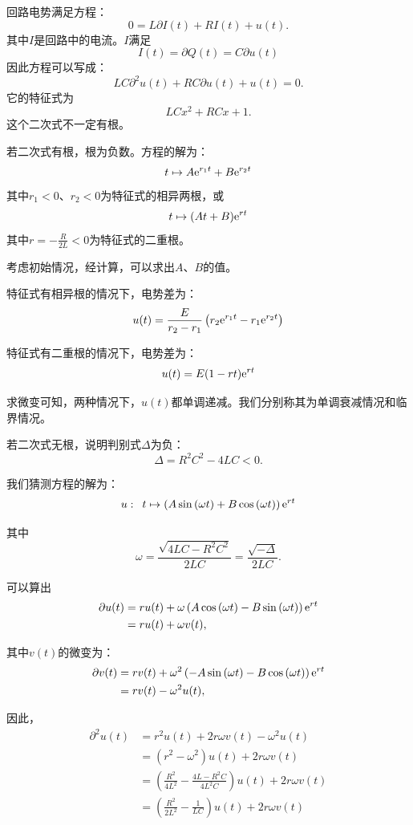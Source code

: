 \documentclass[12pt,UTF8,fontset=none]{ctexbook}
\begin{document}
\begin{so}
    回路电势满足方程：
    $$ 0 = L\partial I(t) + RI(t) + u(t).$$
    其中$I$是回路中的电流。$I$满足
    $$ I(t) = \partial Q(t) = C\partial u(t) $$
    因此方程可以写成：
    $$ LC\partial^2 u(t) + RC\partial u(t) + u(t) = 0.$$
    它的特征式为
    $$ LC x^2 + RC x + 1.$$
    这个二次式不一定有根。

    若二次式有根，根为负数。方程的解为：
    $$ t \mapsto A\mathrm{e}^{r_1t} + B\mathrm{e}^{r_2t} $$
    其中$r_1<0$、$r_2<0$为特征式的相异两根，或
    $$ t \mapsto (At + B)\mathrm{e}^{rt} $$
    其中$r = -\frac{R}{2L} < 0$为特征式的二重根。

    考虑初始情况，经计算，可以求出$A$、$B$的值。

    特征式有相异根的情况下，电势差为：
    $$ u(t) = \frac{E}{r_2 - r_1}\left(r_2\mathrm{e}^{r_1t} - r_1\mathrm{e}^{r_2t}\right) $$ 

    特征式有二重根的情况下，电势差为：
    $$ u(t) =  E(1 - rt)\mathrm{e}^{rt}$$

    求微变可知，两种情况下，$u(t)$都单调递减。我们分别称其为单调衰减情况和临界情况。

    若二次式无根，说明判别式$\Delta$为负：
    $$ \Delta = R^2C^2 - 4LC < 0.$$

    我们猜测方程的解为：
    $$ u: \,\,\,t \mapsto \left(A\sin{(\omega t)} + B\cos{(\omega t)}\right)\mathrm{e}^{rt} $$

    其中
    $$\omega = \frac{\sqrt{4LC - R^2C^2}}{2LC} = \frac{\sqrt{-\Delta}}{2LC}. $$

    可以算出
    \begin{align*}
        \partial u(t) &= ru(t) + \omega \left(A\cos{(\omega t)} - B\sin{(\omega t)}\right)\mathrm{e}^{rt} \\
        &= ru(t) + \omega v(t),
    \end{align*}

    其中$v(t)$的微变为：
    \begin{align*}
        \partial v(t) &= rv(t) + \omega^2 \left(- A\sin{(\omega t)} - B\cos{(\omega t)}\right)\mathrm{e}^{rt} \\
        &= rv(t) - \omega^2 u(t),
    \end{align*}

    因此，
    \begin{align*}        
        \partial^2 u(t) &= r^2u(t) + 2r\omega v(t) - \omega^2u(t) \\
        &= (r^2 - \omega^2 )u(t) + 2r\omega v(t) \\
        &= \left(\frac{R^2}{4L^2} - \frac{4L - R^2C}{4L^2C}\right)u(t) + 2r\omega v(t)\\
        &= \left(\frac{R^2}{2L^2} - \frac{1}{LC} \right)u(t) + 2r\omega v(t)
    \end{align*}


\end{so}
\end{document}
